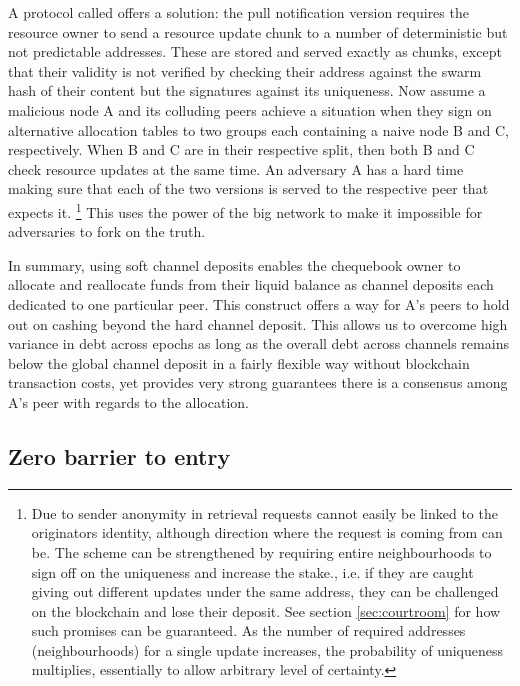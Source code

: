 A protocol called  offers a solution: 
the pull notification version requires the resource owner to send a resource update chunk to a number of 
deterministic but not predictable addresses. These are stored and served exactly as chunks, except that their validity is not verified by checking  their address against the swarm hash of their content but the signatures against its uniqueness. Now assume a malicious node A and its colluding peers achieve a situation when they sign on alternative allocation tables to two groups each containing a naive node B and C, respectively.
When B and C are in their respective split, then both B and C check resource updates at the same time. An adversary A has a hard time making sure that each of the two versions is served to the respective peer that expects it.%
%
\footnote{Due to sender anonymity in retrieval requests cannot easily be linked to the originators identity, although direction where the request is coming from can be. The scheme can be strengthened by requiring entire neighbourhoods to sign off on the uniqueness and increase the stake., i.e. if they are caught giving out different updates under the same address, they can be challenged on the blockchain and lose their deposit. See section \ref{sec:courtroom} for how such promises can be guaranteed. 
As the number of required addresses (neighbourhoods) for a single update increases, the probability of uniqueness multiplies, essentially to allow arbitrary level of certainty.}
%
This uses the power of the big network to make it impossible for adversaries to fork on the truth.

In summary, using soft channel deposits enables the chequebook owner to allocate and reallocate funds from their liquid balance as channel deposits each dedicated to one particular peer. 
This construct offers  a way for A's peers to hold out on cashing beyond the hard channel deposit. 
This  allows us to overcome high variance in debt across epochs as long as the overall debt across channels remains below the global channel deposit in a fairly flexible way without blockchain transaction costs, 
yet provides very strong guarantees there is a consensus among A's peer with regards to 
the allocation. 

\subsection{Zero barrier to entry}

